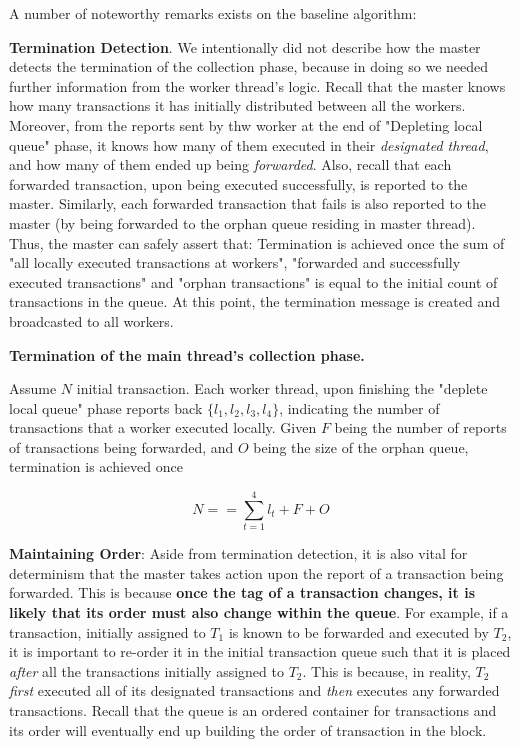 A number of noteworthy remarks exists on the baseline algorithm:

\textbf{Termination Detection}. We intentionally did not describe how the master detects the
termination of the collection phase, because in doing so we needed further information from the
worker thread's logic. Recall that the master knows how many transactions it has initially
distributed between all the workers. Moreover, from the reports sent by thw worker at the end of
"Depleting local queue" phase, it knows how many of them executed in their \textit{designated
thread}, and how many of them ended up being \textit{forwarded}. Also, recall that each forwarded
transaction, upon being executed successfully, is reported to the master. Similarly, each forwarded
transaction that fails is also reported to the master (by being forwarded to the orphan queue
residing in master thread). Thus, the master can safely assert that: Termination is achieved once
the sum of "all locally executed transactions at workers", "forwarded and successfully executed
transactions" and "orphan transactions" is equal to the initial count of transactions in the queue.
At this point, the termination message is created and broadcasted to all workers.

\begin{definition}
	\textbf{Termination of the main thread's collection phase. }

	Assume $N$ initial transaction. Each worker thread, upon finishing the "deplete local queue"
	phase reports back $\{ l_{1}, l_{2}, l_{3}, l_{4} \}$, indicating the number of transactions
	that a worker executed locally. Given $F$ being the number of reports of transactions being
	forwarded, and $O$ being the size of the orphan queue, termination is achieved once

	\begin{equation}
		N == \sum_{t = 1}^{4} l_{t} + F + O
	\end{equation}
\end{definition}


\textbf{Maintaining Order}: Aside from termination detection, it is also vital for determinism that
the master takes action upon the report of a transaction being forwarded. This is because
\textbf{once the tag of a transaction changes, it is likely that its order must also change within
the queue}. For example, if a transaction, initially assigned to $T_{1}$ is known to be forwarded
and executed by $T_{2}$, it is important to re-order it in the initial transaction queue such that
it is placed \textit{after} all the transactions initially assigned to $T_{2}$. This is because, in
reality, $T_{2}$ \textit{first} executed all of its designated transactions and \textit{then}
executes any forwarded transactions. Recall that the queue is an ordered container for transactions
and its order will eventually end up building the order of transaction in the block.

